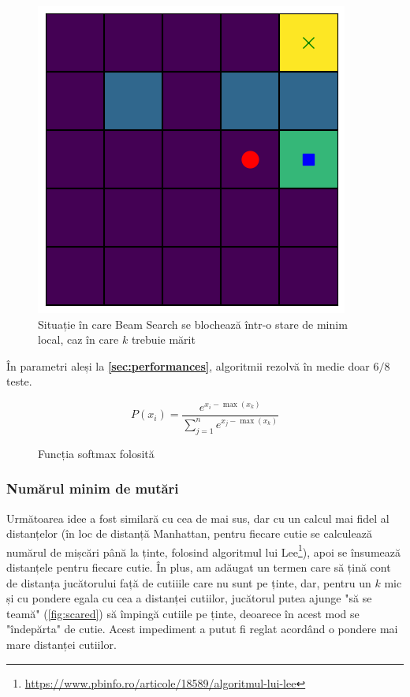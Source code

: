 \documentclass{article}
\begin{document}
\begin{figure}[ht]
    \begin{center}
        \includegraphics[scale=0.4]{manhattan.png}
    \end{center}
    \caption{Situație în care Beam Search se blochează într-o stare  de minim 
    local, caz în care $k$ trebuie mărit}
\end{figure}

În parametri aleși la \textbf{\ref{sec:performances}}, algoritmii rezolvă în 
medie doar $6/8$ teste.

\begin{figure}[ht]
    \[ P(x_i) = \frac{e^{x_i - \max(x_k)}}{\sum_{j=1}^n e^{x_j - \max(x_k)}} \]
    \caption{Funcția softmax folosită}
    \label{for:softmax}
\end{figure}

\subsubsection{Numărul minim de mutări}\label{sec:min_moves}
Următoarea idee a fost similară cu cea de mai sus, dar cu un calcul mai fidel al
distanțelor (în loc de distanță Manhattan, pentru fiecare cutie se calculează 
numărul de mișcări până la ținte, folosind algoritmul lui 
Lee\footnote{\url{https://www.pbinfo.ro/articole/18589/algoritmul-lui-lee}}), 
apoi se însumează distanțele pentru fiecare cutie. În plus, am adăugat un 
termen care să țină cont de distanța jucătorului față de cutiiile care nu sunt 
pe ținte, dar, pentru un $k$ mic și cu pondere egala cu cea a distanței 
cutiilor, jucătorul putea ajunge "să se teamă" (\ref{fig:scared}) să împingă 
cutiile pe ținte, deoarece în acest mod se "îndepărta" de cutie. Acest 
impediment a putut fi reglat acordând o pondere mai mare distanței cutiilor.
\end{document}
